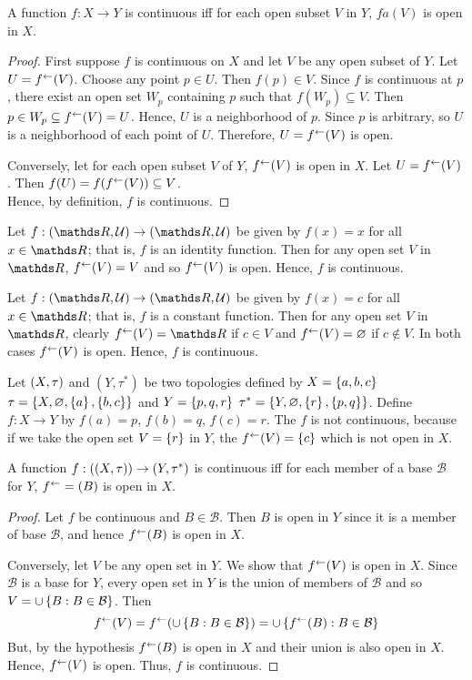 \documentclass[../main-sheet.tex]{subfiles}
\begin{document}
\begin{thm}
    A function \(f:X\to Y\) is continuous iff for each open subset \(V\) in \(Y\), \(fa(V)\) is open in \(X\).
\end{thm}
\begin{proof}
    First suppose \(f\) is continuous on \(X\) and let \(V\) be any open subset of \(Y\). Let \(U=f^{\leftarrow}(V)\). Choose any point \(p\in U\). Then \(f(p)\in V\). Since \(f\) is continuous at \(p\), there exist an open set \(W_p\) containing \(p\) such that \(f(W_p)\subseteq V\). Then \(p\in W_p \subseteq f^{\leftarrow}(V)=U\). Hence, \(U\) is a neighborhood of \(p\). Since \(p\) is arbitrary, so \(U\) is a neighborhood of each point of \(U\). Therefore, \(U=f^{\leftarrow}(V)\) is open.
    
    Conversely, let for each open subset \(V\) of \(Y\), \(f^{\leftarrow}(V)\) is open in \(X\). Let \(U=f^{\leftarrow}(V)\). Then \(f(U)=f(f^{\leftarrow}(V))\subseteq V\).\\
    Hence, by definition, \(f\) is continuous.
\end{proof}
\begin{ex}
    Let \(f:(\R,\mathcal{U})\to (\R,\mathcal{U})\) be given by \(f(x)=x\) for all \(x\in\R\); that is, \(f\) is an identity function. Then for any open set \(V\) in \(\R\), \(f^{\leftarrow}(V)=V\) and so \(f^{\leftarrow}(V)\) is open. Hence, \(f\) is continuous.
    \label{ex:3.3}
\end{ex}
\begin{ex}
    Let \(f:(\R,\mathcal{U})\to (\R,\mathcal{U})\) be given by \(f(x)=c\) for all \(x\in\R\); that is, \(f\) is a constant function. Then for any open set \(V\) in \(\R\), clearly \(\fa(V)=\R\) if \(c\in V\) and \(f^{\leftarrow}(V)=\varnothing\) if \(c\notin V\). In both cases \(f^{\leftarrow}(V)\) is open. Hence, \(f\) is continuous.
\end{ex}
\begin{ex}
    Let \((X, \tau)\) and \((Y,\tau^{*})\) be two topologies defined by \(X=\left\{a,b,c\right\}\) \(\tau=\left\{X,\varnothing,\left\{a\right\},\left\{b,c\right\}\right\}\) and \(Y=\left\{p,q,r\right\}\) \(\tau^{*}=\left\{Y,\varnothing,\left\{r\right\},\left\{p,q\right\}\right\}\). Define \(f:X\to Y \) by \(f(a)=p\), \(f(b)=q\), \(f(c)=r\). The \(f\) is not continuous, because if we take the open set \(V=\left\{r\right\} \) in \(Y\), the \(f^{\leftarrow}(V)=\left\{c\right\}\) which is not open in \(X\).
\end{ex}
\begin{thm}
    A function \(f:((X, \tau))\to(Y,\tau^{*})\) is continuous iff for each member of a base \(\mathcal{B}\) for \(Y\), \(f^{\leftarrow} =(B)\) is open in \(X\).
\end{thm}
\begin{proof}
    Let \(f\) be continuous and \(B\in \mathcal{B}\). Then \(B\) is open in \(Y\) since it is a member of base \(\mathcal{B}\), and hence \(f^{\leftarrow}(B)\) is open in \(X\).

    Conversely, let \(V\) be any open set in \(Y\). We show that \(f^{\leftarrow}(V)\) is open in \(X\). Since \(\mathcal{B}\) is a base for \(Y\), every open set in \(Y\) is the union of members of \(\mathcal{B}\) and so \(V=\cup\left\{B:B\in\mathcal{B}\right\}\). Then
    \[f^{\leftarrow}(V)=f^{\leftarrow}(\cup\left\{B:B\in\mathcal{B}\right\})=\cup\left\{f^{\leftarrow}(B):B\in \mathcal{B}\right\}\]
    But, by the hypothesis \(f^{\leftarrow}(B)\) is open in \(X\) and their union is also open in \(X\). Hence, \(f^{\leftarrow}(V)\) is open. Thus, \(f\) is continuous.
\end{proof}
\end{document}
